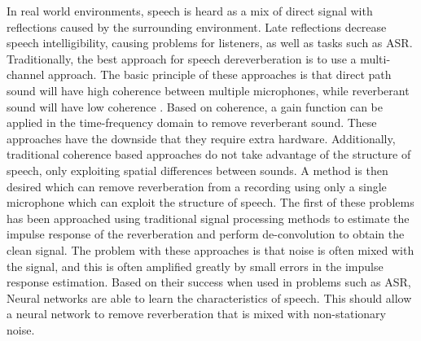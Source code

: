 In real world environments, speech is heard as a mix of direct signal with reflections caused by the surrounding environment. Late reflections decrease speech intelligibility, causing problems for listeners, as well as tasks such as \ac{ASR}. Traditionally, the best approach for speech dereverberation is to use a multi-channel approach. The basic principle of these approaches is that direct path sound will have high coherence between multiple microphones, while reverberant sound will have low coherence . Based on coherence, a gain function can be applied in the time-frequency domain to remove reverberant sound. These approaches have the downside that they require extra hardware. Additionally, traditional coherence based approaches do not take advantage of the structure of speech, only exploiting spatial differences between sounds. A method is then desired which can remove reverberation from a recording using only a single microphone which can exploit the structure of speech. The first of these problems has been approached using traditional signal processing methods to estimate the impulse response of the reverberation and perform de-convolution to obtain the clean signal. The problem with these approaches is that noise is often mixed with the signal, and this is often amplified greatly by small errors in the impulse response estimation. Based on their success when used in problems such as \ac{ASR}, Neural networks are able to learn the characteristics of speech. This should allow a neural network to remove reverberation that is mixed with non-stationary noise.
